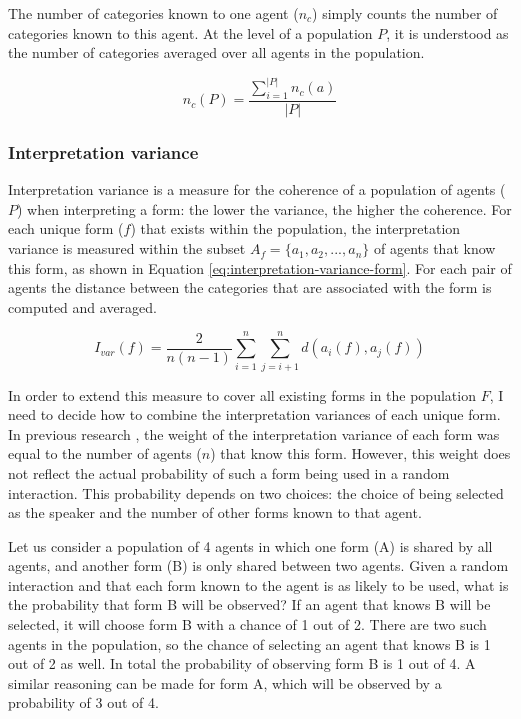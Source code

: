 The number of categories known to one agent ($n_c$) simply counts the
number of categories known to this agent. At the level of a population
$P$, it is understood as the number of categories averaged over all
agents in the population.

\begin{equation}
n_c(P) = \frac{\displaystyle \sum_{i=1}^{|P|} n_c(a)}{|P|}
\label{eq:number-of-categories-population}
\end{equation}

\subsubsection{Interpretation variance}

Interpretation variance is a measure for the coherence of a population
of agents ($P$) when interpreting a form: the lower the variance, the
higher the coherence. For each unique form ($f$) that exists within
the population, the interpretation variance is measured within the
subset $A_f = \{a_1, a_2, ..., a_n\}$ of agents that know this form,
as shown in Equation \ref{eq:interpretation-variance-form}. For each
pair of agents the distance between the categories that are associated
with the form is computed and averaged.

\begin{equation}
I_{var} (f) = \frac{2}{n(n-1)} \sum^n_{i=1} \sum^n_{j=i+1} d(a_i(f), a_j(f))
\label{eq:interpretation-variance-form}
\end{equation}

In order to extend this measure to cover all existing forms in the
population $F$, I need to decide how to combine the interpretation
variances of each unique form. In previous research
\citep[e.g.][]{belpaeme02factors}, the weight of the interpretation
variance of each form was equal to the number of agents ($n$) that
know this form. However, this weight does not reflect the actual
probability of such a form being used in a random interaction. This
probability depends on two choices: the choice of being selected as
the speaker and the number of other forms known to that agent.

Let us consider a population of 4 agents in which one form (A) is
shared by all agents, and another form (B) is only shared between two
agents. Given a random interaction and that each form known to the
agent is as likely to be used, what is the probability that form B
will be observed? If an agent that knows B will be selected, it will
choose form B with a chance of 1 out of 2. There are two such agents
in the population, so the chance of selecting an agent that knows B is
1 out of 2 as well. In total the probability of observing form B is 1
out of 4. A similar reasoning can be made for form A, which will be
observed by a probability of 3 out of 4.


